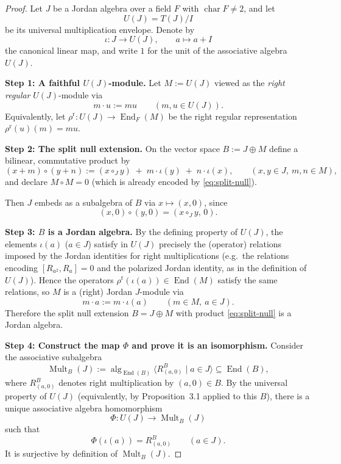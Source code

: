 \documentclass{article}
\begin{document}
\begin{proof}
Let $J$ be a Jordan algebra over a field $F$ with $\operatorname{char}F\neq 2$, and let
\[
U(J)=T(J)/I
\]
be its universal multiplication envelope. Denote by
\[
\iota:J\longrightarrow U(J),\qquad a\longmapsto a+I
\]
the canonical linear map, and write $1$ for the unit of the associative algebra $U(J)$.

\noindent\textbf{Step 1: A faithful $U(J)$-module.}
Let $M:=U(J)$ viewed as the \emph{right regular} $U(J)$-module via
\[
m\cdot u:=mu\qquad(m,u\in U(J)).
\]
Equivalently, let $\rho^{\mathrm r}:U(J)\to \operatorname{End}_F(M)$ be the right regular representation
$\rho^{\mathrm r}(u)(m)=mu$.

\noindent\textbf{Step 2: The split null extension.}
On the vector space $B:=J\oplus M$ define a bilinear, commutative product by
\begin{equation}\label{eq:split-null}
(x+m)\circ (y+n)
:= (x\circ_J y)\;+\; m\cdot \iota(y)\;+\; n\cdot \iota(x),
\qquad (x,y\in J,\ m,n\in M),
\end{equation}
and declare $M\circ M=0$ (which is already encoded by \eqref{eq:split-null}).

Then $J$ embeds as a subalgebra of $B$ via $x\mapsto (x,0)$, since
\[
(x,0)\circ (y,0)=(x\circ_J y,\,0).
\]

\noindent\textbf{Step 3: $B$ is a Jordan algebra.}
By the defining property of $U(J)$, the elements $\iota(a)$ ($a\in J$) satisfy in $U(J)$ precisely the
(operator) relations imposed by the Jordan identities for right multiplications (e.g.\ the relations
encoding $[R_{a^2},R_a]=0$ and the polarized Jordan identity, as in the definition of $U(J)$).
Hence the operators $\rho^{\mathrm r}(\iota(a))\in \operatorname{End}(M)$ satisfy the same relations, so $M$ is a
(right) Jordan $J$-module via
\[
m\cdot a:=m\cdot \iota(a)\qquad (m\in M,\ a\in J).
\]
Therefore the split null extension $B=J\oplus M$ with product \eqref{eq:split-null} is a Jordan algebra.

\noindent\textbf{Step 4: Construct the map $\Phi$ and prove it is an isomorphism.}
Consider the associative subalgebra
\[
\operatorname{Mult}_B(J):=\operatorname{alg}_{\operatorname{End}(B)}\langle R^B_{(a,0)}\mid a\in J\rangle
\subseteq \operatorname{End}(B),
\]
where $R^B_{(a,0)}$ denotes right multiplication by $(a,0)\in B$.
By the universal property of $U(J)$ (equivalently, by Proposition~3.1 applied to this $B$), there is a unique
associative algebra homomorphism
\[
\Phi:U(J)\longrightarrow \operatorname{Mult}_B(J)
\]
such that
\[
\Phi(\iota(a))=R^B_{(a,0)}\qquad (a\in J).
\]
It is surjective by definition of $\operatorname{Mult}_B(J)$.


\end{proof}
\end{document}
